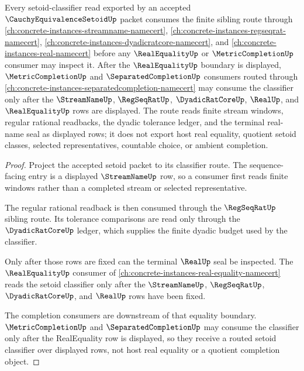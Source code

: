 \begin{theorem}
\label{thm:cauchy-equivalence-setoid-sibling-route}
Every setoid-classifier read exported by an accepted $\CauchyEquivalenceSetoidUp$ packet consumes the finite sibling route through \autoref{ch:concrete-instances-streamname-namecert}, \autoref{ch:concrete-instances-regseqrat-namecert}, \autoref{ch:concrete-instances-dyadicratcore-namecert}, and \autoref{ch:concrete-instances-real-namecert} before any $\RealEqualityUp$ or $\MetricCompletionUp$ consumer may inspect it. After the $\RealEqualityUp$ boundary is displayed, $\MetricCompletionUp$ and $\SeparatedCompletionUp$ consumers routed through \autoref{ch:concrete-instances-separatedcompletion-namecert} may consume the classifier only after the $\StreamNameUp$, $\RegSeqRatUp$, $\DyadicRatCoreUp$, $\RealUp$, and $\RealEqualityUp$ rows are displayed. The route reads finite stream windows, regular rational readbacks, the dyadic tolerance ledger, and the terminal real-name seal as displayed rows; it does not export host real equality, quotient setoid classes, selected representatives, countable choice, or ambient completion.
\end{theorem}
\begin{proof}
Project the accepted setoid packet to its classifier route. The sequence-facing entry is a displayed $\StreamNameUp$ row, so a consumer first reads finite windows rather than a completed stream or selected representative.

The regular rational readback is then consumed through the $\RegSeqRatUp$ sibling route. Its tolerance comparisons are read only through the $\DyadicRatCoreUp$ ledger, which supplies the finite dyadic budget used by the classifier.

Only after those rows are fixed can the terminal $\RealUp$ seal be inspected. The $\RealEqualityUp$ consumer of \autoref{ch:concrete-instances-real-equality-namecert} reads the setoid classifier only after the $\StreamNameUp$, $\RegSeqRatUp$, $\DyadicRatCoreUp$, and $\RealUp$ rows have been fixed.

The completion consumers are downstream of that equality boundary. $\MetricCompletionUp$ and $\SeparatedCompletionUp$ may consume the classifier only after the RealEquality row is displayed, so they receive a routed setoid classifier over displayed rows, not host real equality or a quotient completion object.
\end{proof}
